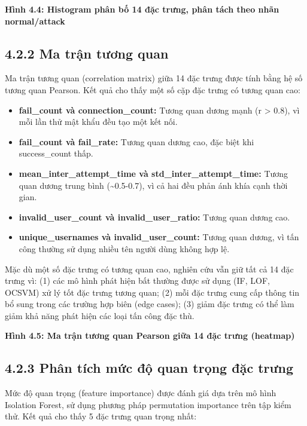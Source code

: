 \documentclass[
  a4paper]{report}
\providecommand{\tightlist}{%
  \setlength{\itemsep}{0pt}\setlength{\parskip}{0pt}}
\begin{document}
\textbf{Hình 4.4: Histogram phân bố 14 đặc trưng, phân tách theo nhãn
normal/attack}

\subsection{4.2.2 Ma trận tương
quan}\label{ma-trux1eadn-tux1b0ux1a1ng-quan}

Ma trận tương quan (correlation matrix) giữa 14 đặc trưng được tính bằng
hệ số tương quan Pearson. Kết quả cho thấy một số cặp đặc trưng có tương
quan cao:

\begin{itemize}
\tightlist
\item
  \textbf{fail\_count và connection\_count:} Tương quan dương mạnh (r
  \textgreater{} 0.8), vì mỗi lần thử mật khẩu đều tạo một kết nối.
\item
  \textbf{fail\_count và fail\_rate:} Tương quan dương cao, đặc biệt khi
  success\_count thấp.
\item
  \textbf{mean\_inter\_attempt\_time và std\_inter\_attempt\_time:}
  Tương quan dương trung bình (\textasciitilde0.5-0.7), vì cả hai đều
  phản ánh khía cạnh thời gian.
\item
  \textbf{invalid\_user\_count và invalid\_user\_ratio:} Tương quan
  dương cao.
\item
  \textbf{unique\_usernames và invalid\_user\_count:} Tương quan dương,
  vì tấn công thường sử dụng nhiều tên người dùng không hợp lệ.
\end{itemize}

Mặc dù một số đặc trưng có tương quan cao, nghiên cứu vẫn giữ tất cả 14
đặc trưng vì: (1) các mô hình phát hiện bất thường được sử dụng (IF,
LOF, OCSVM) xử lý tốt đặc trưng tương quan; (2) mỗi đặc trưng cung cấp
thông tin bổ sung trong các trường hợp biên (edge cases); (3) giảm đặc
trưng có thể làm giảm khả năng phát hiện các loại tấn công đặc thù.

\textbf{Hình 4.5: Ma trận tương quan Pearson giữa 14 đặc trưng
(heatmap)}

\subsection{4.2.3 Phân tích mức độ quan trọng đặc
trưng}\label{phuxe2n-tuxedch-mux1ee9c-ux111ux1ed9-quan-trux1ecdng-ux111ux1eb7c-trux1b0ng}

Mức độ quan trọng (feature importance) được đánh giá dựa trên mô hình
Isolation Forest, sử dụng phương pháp permutation importance trên tập
kiểm thử. Kết quả cho thấy 5 đặc trưng quan trọng nhất:
\end{document}
